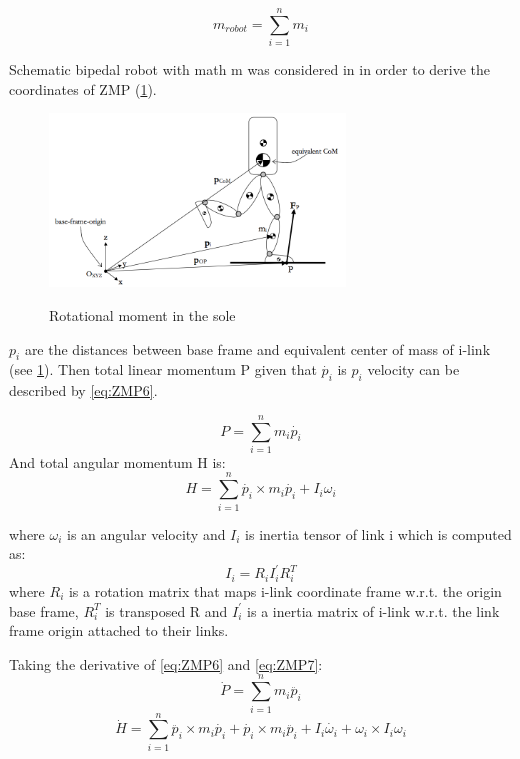 \documentclass[12pt,a4paper]{report}
\begin{document}
		\begin{equation}\label{eq:ZMP5}
			m_{robot} = \sum^n_{i=1}{m_i}
		\end{equation}

		Schematic bipedal robot with math m was considered in \cite{dekker2009zero} in order to derive the coordinates of ZMP (\cref{fig:3}).

		\begin{figure}[H]
			\vspace{-0.2cm}
			\centering
			{\includegraphics[width=0.7\textwidth]{3}}
			\caption{Rotational moment in the sole \cite{dekker2009zero}}
			\label{fig:3}
			\vspace{-0.1cm}
		\end{figure}

		$p_i$ are the distances between base frame and equivalent center of mass of i-link (see \cref{fig:3}). Then total linear momentum P given that $\dot{p_i}$ is $p_i$ velocity can be described by \ref{eq:ZMP6}.
	
		\begin{equation} \label{eq:ZMP6}
			P = \sum^n_{i=1}{m_i \dot{p_i}}
		\end{equation}
		And total angular momentum H is:
		\begin{equation} \label{eq:ZMP7}
			H = \sum^n_{i=1}{\dot{p_i} \times m_i \dot{p_i} + I_i \omega_i}
		\end{equation}

		where $\omega_i$ is an angular velocity and $I_i$ is inertia tensor of link i which is computed as:
		\begin{equation} \label{eq:ZMP8}
			I_i = R_i I_i^{\prime} R_i^T
		\end{equation}
		where $R_i$ is a rotation matrix that maps i-link coordinate frame w.r.t. the origin base frame, $R_i^T$ is transposed R and $I_i^{\prime}$ is a inertia matrix of i-link w.r.t. the link frame origin attached to their links.

		Taking the derivative of \ref{eq:ZMP6} and \ref{eq:ZMP7}:
		\begin{equation} \label{eq:ZMP9}
			\dot{P} = \sum^n_{i=1}{m_i \ddot{p_i}}
		\end{equation}
		\begin{equation} \label{eq:ZMP10}
			\dot{H} = \sum^n_{i=1}{\ddot{p_i} \times m_i \dot{p_i} + \dot{p_i} \times m_i \ddot{p_i} + I_i \dot{\omega_i}} + \omega_i \times I_i \omega_i
		\end{equation}
\end{document}
